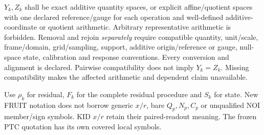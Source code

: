 {{$Y_k,Z_k$ shall be exact additive quantity spaces, or explicit affine/quotient
spaces with one declared reference/gauge for each operation and well-defined
additive-coordinate or quotient arithmetic. Arbitrary representative arithmetic
is forbidden. Removal and rejoin \emph{separately} require compatible quantity,
unit/scale, frame/domain, grid/sampling, support, additive origin/reference or
gauge, null-space state, calibration and response conventions. Every conversion
and alignment is declared. Pairwise compatibility does not imply $Y_k=Z_k$.
Missing compatibility makes the affected arithmetic and dependent claim unavailable.

Use $\rho_k$ for residual, $F_k$ for the complete residual procedure and $S_k$
for state. New FRUIT notation does not borrow generic $x/r$, bare $Q_p,N_p,C_p$
or unqualified NOI member/sign symbols. KID $x/r$ retain their paired-readout
meaning. The frozen PTC quotation has its own covered local symbols.
}}

\newcommand{\Onoi}{\mathcal H_{k,g}^{\mathrm{NOI}}}
\newcommand{\Lnoi}{\mathcal D_{k,g}^{\mathrm{NOI}}}
